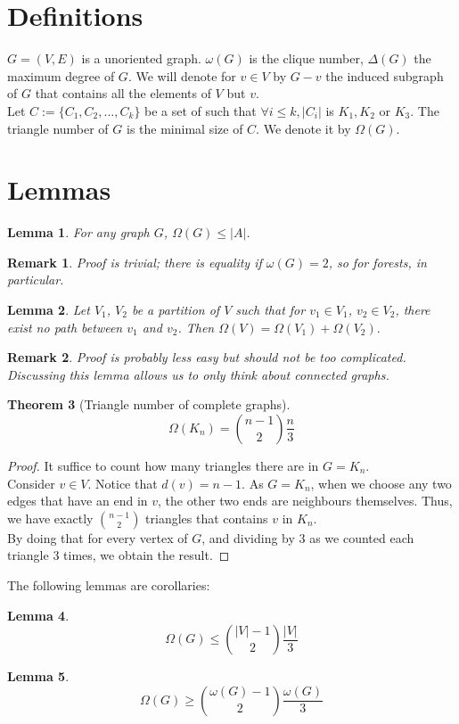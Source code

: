 \documentclass[12pt]{article}
\newtheorem{theorem}{Theorem}[section]
\newtheorem{lemma}[theorem]{Lemma}
\newtheorem*{remark}{Remark}
\begin{document}
\section{Definitions}
    $G = (V, E)$ is a unoriented graph. $\omega(G)$ is the clique number, $\Delta(G)$ the maximum degree of $G$. 
    We will denote for $v \in V$ by $G-v$ the induced subgraph of $G$ that contains all the elements of $V$ but $v$. \\
    Let $C:=\{C_1, C_2, ... , C_k\}$ be a set of such that $\forall i \le k, |C_i|$ is $K_1, K_2$ or $K_3$. The triangle number of $G$
    is the minimal size of $C$. We denote it by $\Omega(G)$.

\section{Lemmas}
\begin{lemma}
    For any graph $G$, $\Omega(G) \le |A|$. 
\end{lemma}

\begin{remark}
    Proof is trivial; there is equality if $\omega(G) = 2$, so for forests, in particular.  
\end{remark}

\begin{lemma}
    Let $V_1$, $V_2$ be a partition of $V$ such that for $v_1 \in V_1$, $v_2 \in V_2$, 
    there exist no path between $v_1$ and $v_2$. Then $\Omega(V) = \Omega (V_1) + \Omega(V_2).$ 
\end{lemma}

\begin{remark}
    Proof is probably less easy but should not be too complicated. \\
    Discussing this lemma allows us to only think about connected graphs.
\end{remark}

\begin{theorem}[Triangle number of complete graphs]
    $$\Omega(K_n) = {n-1 \choose 2} \frac{n}{3}$$
\end{theorem}

\begin{proof}
    It suffice to count how many triangles there are in $G = K_n$.\\
    Consider $v\in V$. Notice that $d(v) = n-1$. As $G = K_n$, when we choose any two edges that have an end in $v$,
    the other two ends are neighbours themselves. Thus, we have exactly ${n-1 \choose 2}$ triangles that contains $v$ in $K_n$.\\
    By doing that for every vertex of $G$, and dividing by $3$ as we counted each triangle $3$ times, we obtain the result. 
\end{proof}

The following lemmas are corollaries:
\begin{lemma}
    $$\Omega(G) \le {|V|-1 \choose 2} \frac{|V|}{3}$$
\end{lemma}

\begin{lemma}
    $$\Omega(G) \ge {\omega(G)-1 \choose 2} \frac{\omega(G)}{3}$$
\end{lemma}
\end{document}
